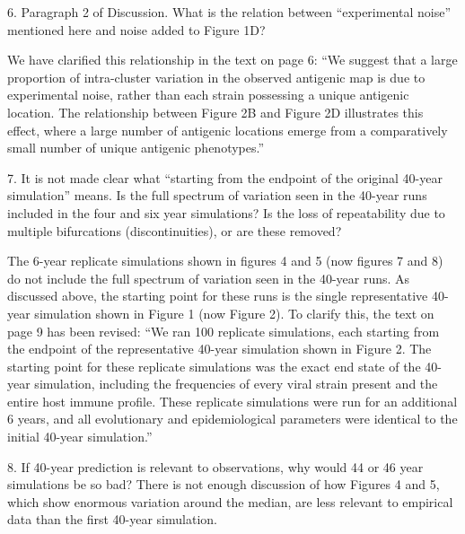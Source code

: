 \documentclass[11pt,oneside,letterpaper]{article}
\def\comment#1{
#1
}
\def\response#1{
\begin{bf}
#1
\end{bf}
}
\def\break{\vspace{0.2cm}}
\begin{document}
\break

\comment{6. Paragraph 2 of Discussion. What is the relation between ``experimental noise'' mentioned here and noise added to Figure 1D?}

\response{We have clarified this relationship in the text on page 6: ``We suggest that a large proportion of intra-cluster variation in the observed antigenic map is due to experimental noise, rather than each strain possessing a unique antigenic location.  The relationship between Figure 2B and Figure 2D illustrates this effect, where a large number of antigenic locations emerge from a comparatively small number of unique antigenic phenotypes.''}

\break

\comment{7. It is not made clear what ``starting from the endpoint of the original 40-year simulation'' means. Is the full spectrum of variation seen in the 40-year runs included in the four and six year simulations? Is the loss of repeatability due to multiple bifurcations (discontinuities), or are these removed?}

\response{The 6-year replicate simulations shown in figures 4 and 5 (now figures 7 and 8) do not include the full spectrum of variation seen in the 40-year runs.  As discussed above, the starting point for these runs is the single representative 40-year simulation shown in Figure 1 (now Figure 2).  To clarify this, the text on page 9 has been revised: ``We ran 100 replicate simulations, each starting from the endpoint of the representative 40-year simulation shown in Figure 2.  The starting point for these replicate simulations was the exact end state of the 40-year simulation, including the frequencies of every viral strain present and the entire host immune profile.  These replicate simulations were run for an additional 6 years, and all evolutionary and epidemiological parameters were identical to the initial 40-year simulation.''}

\break

\comment{8. If 40-year prediction is relevant to observations, why would 44 or 46 year simulations be so bad? There is not enough discussion of how Figures 4 and 5, which show enormous variation around the median, are less relevant to empirical data than the first 40-year simulation.}
\end{document}
